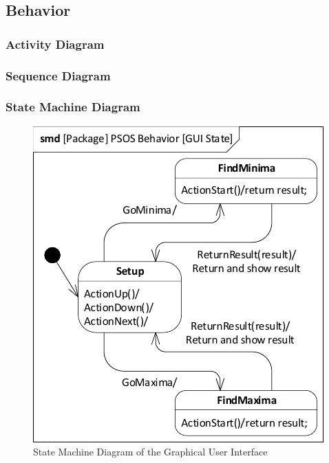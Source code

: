 \subsection{Behavior} \label{requirementspecification:Behavior}

\subsubsection{Activity Diagram}

\subsubsection{Sequence Diagram}

\subsubsection{State Machine Diagram}

\begin{figure}
	\centering
	\includegraphics[width=0.7\linewidth]{diagram/smd_gui_state}
	\caption{State Machine Diagram of the Graphical User Interface}
	\label{fig:smdguistate}
\end{figure}
